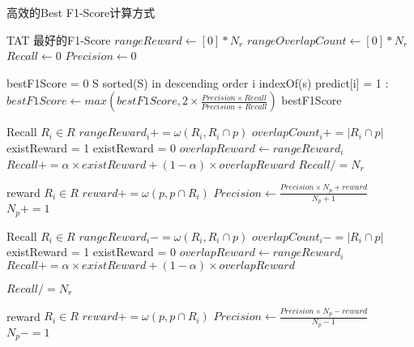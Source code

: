   \begin{breakablealgorithm}
    \caption{高效的Best F1-Score计算方式}
    \begin{algorithmic}[1]
      \Require TAT
      \Ensure 最好的F1-Score
      \State $rangeReward \gets [0] * N_r$
      \State $rangeOverlapCount \gets [0] * N_r$
      \State $Recall \gets 0$
      \State $Precision \gets 0$

      \State

      \State bestF1Score = 0
      \State S \gets sorted(S) in descending order
      \State i \gets indexOf(s)
      \State predict[i] = 1
          \State {}
          \State {}
      \EndIf
      :
          \State {}
          \State {}
      \EndIf
      \State $bestF1Score \gets max(bestF1Score, 2\times\frac{Precision \times Recall}{Precision + Recall})$
      \EndFor
      \State \Return bestF1Score
      \EndFunction
      
      \State

      \State Recall 
      \ForAll $R_i \in R$
            \State $rangeReward_i += \omega(R_i,R_i \cap p)$
            \State $overlapCount_i += |R_i\cap p|$
              \State existReward = 1
            \Else
              \State existReward = 0
            \EndIf
            \State $overlapReward \gets rangeReward_i$
            \State $Recall += \alpha \times existReward + (1-\alpha) \times overlapReward$
      \EndFor
      \State $Recall /= N_r$

      \State

      \State reward 
      \ForAll $R_i \in R$
            \State $reward += \omega(p, p \cap R_i)$
      \EndFor
      \State $Precision \gets \frac{Precision \times N_p + reward}{N_p + 1}$
      \State $N_p += 1$
      \EndFunction

      \State

      \State Recall 
      \ForAll $R_i \in R$
            \State $rangeReward_i -= \omega(R_i,R_i \cap p)$
            \State $overlapCount_i -= |R_i\cap p|$
              \State existReward = 1
            \Else
              \State existReward = 0
            \EndIf
            \State $overlapReward \gets rangeReward_i$
            \State $Recall += \alpha \times existReward + (1-\alpha) \times overlapReward$
      \EndFor

      \State

      \State $Recall /= N_r$

      \State reward 
      \ForAll $R_i \in R$
            \State $reward += \omega(p, p \cap R_i)$
      \EndFor
      \State $Precision \gets \frac{Precision \times N_p - reward}{N_p - 1}$
      \State $N_p -= 1$
      \EndFunction
    \end{algorithmic}
  \end{breakablealgorithm}

